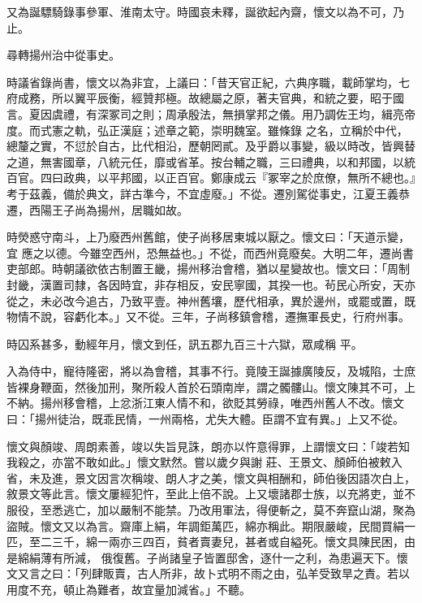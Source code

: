 \begin{pinyinscope}
 又為誕驃騎錄事參軍、淮南太守。時國哀未釋，誕欲起內齋，懷文以為不可，乃止。



 尋轉揚州治中從事史。



 時議省錄尚書，懷文以為非宜，上議曰：「昔天官正紀，六典序職，載師掌均，七府成務，所以翼平辰衡，經贊邦極。故總屬之原，著夫官典，和統之要，昭于國言。夏因虞禮，有深冢司之則；周承殷法，無損掌邦之儀。用乃調佐王均，緝亮帝度。而式憲之軌，弘正漢庭；述章之範，崇明魏室。雖條錄
 之名，立稱於中代，總釐之實，不愆於自古，比代相沿，歷朝罔貳。及乎爵以事變，級以時改，皆興替之道，無害國章，八統元任，靡或省革。按台輔之職，三曰禮典，以和邦國，以統百官。四曰政典，以平邦國，以正百官。鄭康成云『冢宰之於庶僚，無所不總也。』考于茲義，備於典文，詳古準今，不宜虛廢。」不從。遷別駕從事史，江夏王義恭遷，西陽王子尚為揚州，居職如故。



 時熒惑守南斗，上乃廢西州舊館，使子尚移居東城以厭之。懷文曰：「天道示變，宜
 應之以德。今雖空西州，恐無益也。」不從，而西州竟廢矣。大明二年，遷尚書吏部郎。時朝議欲依古制置王畿，揚州移治會稽，猶以星變故也。懷文曰：「周制封畿，漢置司隸，各因時宜，非存相反，安民寧國，其揆一也。茍民心所安，天亦從之，未必改今追古，乃致平壹。神州舊壤，歷代相承，異於邊州，或罷或置，既物情不說，容虧化本。」又不從。三年，子尚移鎮會稽，遷撫軍長史，行府州事。



 時囚系甚多，動經年月，懷文到任，訊五郡九百三十六獄，眾咸稱
 平。



 入為侍中，寵待隆密，將以為會稽，其事不行。竟陵王誕據廣陵反，及城陷，士庶皆裸身鞭面，然後加刑，聚所殺人首於石頭南岸，謂之髑髏山。懷文陳其不可，上不納。揚州移會稽，上忿浙江東人情不和，欲貶其勞祿，唯西州舊人不改。懷文曰：「揚州徒治，既乖民情，一州兩格，尤失大體。臣謂不宜有異。」上又不從。



 懷文與顏竣、周朗素善，竣以失旨見誅，朗亦以忤意得罪，上謂懷文曰：「竣若知我殺之，亦當不敢如此。」懷文默然。嘗以歲夕與謝
 莊、王景文、顏師伯被敕入省，未及進，景文因言次稱竣、朗人才之美，懷文與相酬和，師伯後因語次白上，敘景文等此言。懷文屢經犯忤，至此上倍不說。上又壞諸郡士族，以充將吏，並不服役，至悉逃亡，加以嚴制不能禁。乃改用軍法，得便斬之，莫不奔竄山湖，聚為盜賊。懷文又以為言。齋庫上絹，年調鉅萬匹，綿亦稱此。期限嚴峻，民間買絹一匹，至二三千，綿一兩亦三四百，貧者賣妻兒，甚者或自縊死。懷文具陳民困，由是綿絹薄有所減，
 俄復舊。子尚諸皇子皆置邸舍，逐什一之利，為患遍天下。懷文又言之曰：「列肆販賣，古人所非，故卜式明不雨之由，弘羊受致旱之責。若以用度不充，頓止為難者，故宜量加減省。」不聽。




\end{pinyinscope}
